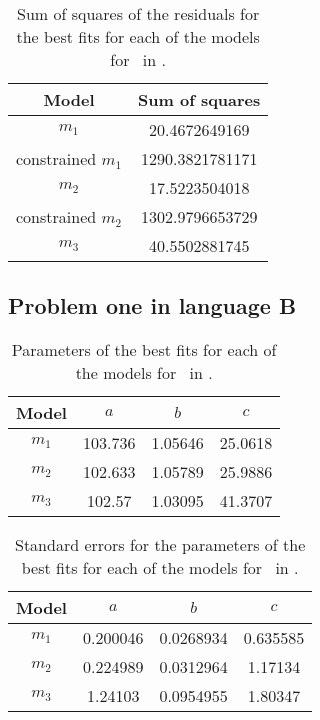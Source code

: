 \begin{table}[ht!]
\centering
\begin{tabular}{|c|c|}
\hline
{\bf Model} & Sum of squares \\
\hline
$m_1$ & 20.4672649169\\
\hline
constrained $m_1$ & 1290.3821781171\\
\hline
$m_2$ & 17.5223504018\\
\hline
constrained $m_2$ & 1302.9796653729\\
\hline
$m_3$ & 40.5502881745 \\
\hline
\end{tabular}
\caption{Sum of squares of the residuals for the best fits for each of the models for \PO\ in \LA.}
\label{table:P1LA:abc:sumsquares}
\end{table}

\subsection{Problem one in language B} \label{subsecP1LB}

\begin{table}[ht!]
\centering
\begin{tabular}{|c|c|c|c|}
\hline
{\bf Model} &  $a$ & $b$ & $c$ \\
\hline
$m_1$ & 103.736 & 1.05646 & 25.0618 \\
\hline
$m_2$ & 102.633 & 1.05789 & 25.9886\\
\hline
$m_3$ & 102.57 & 1.03095 & 41.3707 \\
\hline
\end{tabular}
\caption{Parameters of the best fits for each of the models for \PO\ in \LB.}
\label{table:P1LB:abc}
\end{table}

\begin{table}[ht!]
\centering
\begin{tabular}{|c|c|c|c|}
\hline
{\bf Model} &  $a$ & $b$ & $c$ \\
\hline
$m_1$ & 0.200046 & 0.0268934 & 0.635585 \\
\hline
$m_2$ & 0.224989 & 0.0312964 & 1.17134\\
\hline
$m_3$ & 1.24103 & 0.0954955 & 1.80347 \\
\hline
\end{tabular}
\caption{Standard errors for the parameters of the best fits for each of the models for \PO\ in \LB.}
\label{table:P1LB:abc:error}
\end{table}

